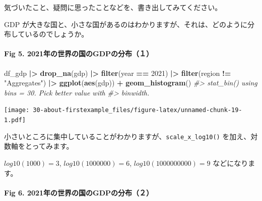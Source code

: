 \documentclass[
  xelatex, ja=standard]{bxjsbook}
\newenvironment{Shaded}{\begin{snugshade}}{\end{snugshade}}
\newcommand{\CommentTok}[1]{\textcolor[rgb]{0.56,0.35,0.01}{\textit{#1}}}
\newcommand{\DecValTok}[1]{\textcolor[rgb]{0.00,0.00,0.81}{#1}}
\newcommand{\FunctionTok}[1]{\textcolor[rgb]{0.13,0.29,0.53}{\textbf{#1}}}
\newcommand{\NormalTok}[1]{#1}
\newcommand{\SpecialCharTok}[1]{\textcolor[rgb]{0.81,0.36,0.00}{\textbf{#1}}}
\newcommand{\StringTok}[1]{\textcolor[rgb]{0.31,0.60,0.02}{#1}}
\theoremstyle{definition}
\theoremstyle{definition}
\theoremstyle{definition}
\theoremstyle{definition}
\theoremstyle{remark}
\begin{document}
気づいたこと、疑問に思ったことなどを、書き出してみてください。

GDP が大きな国と、小さな国があるのはわかりますが、それは、どのように分布しているのでしょうか。

\hypertarget{fig-5.-2021ux5e74ux306eux4e16ux754cux306eux56fdux306egdpux306eux5206ux5e03uxff11}{%
\paragraph{Fig 5. 2021年の世界の国のGDPの分布（１）}\label{fig-5.-2021ux5e74ux306eux4e16ux754cux306eux56fdux306egdpux306eux5206ux5e03uxff11}}

\begin{Shaded}
\begin{Highlighting}[]
\NormalTok{df\_gdp }\SpecialCharTok{|\textgreater{}} \FunctionTok{drop\_na}\NormalTok{(gdp) }\SpecialCharTok{|\textgreater{}} 
  \FunctionTok{filter}\NormalTok{(year }\SpecialCharTok{==} \DecValTok{2021}\NormalTok{) }\SpecialCharTok{|\textgreater{}} \FunctionTok{filter}\NormalTok{(region }\SpecialCharTok{!=} \StringTok{"Aggregates"}\NormalTok{) }\SpecialCharTok{|\textgreater{}}
  \FunctionTok{ggplot}\NormalTok{(}\FunctionTok{aes}\NormalTok{(gdp)) }\SpecialCharTok{+} \FunctionTok{geom\_histogram}\NormalTok{()}
\CommentTok{\#\textgreater{} \textasciigrave{}stat\_bin()\textasciigrave{} using \textasciigrave{}bins = 30\textasciigrave{}. Pick better value with}
\CommentTok{\#\textgreater{} \textasciigrave{}binwidth\textasciigrave{}.}
\end{Highlighting}
\end{Shaded}

\texttt{[image: 30-about-firstexample\_files/figure-latex/unnamed-chunk-19-1.pdf]}

小さいところに集中していることがわかりますが、\texttt{scale\_x\_log10()} を加え、対数軸をとってみます。

\(log10(1000) = 3\), \(log10(1000000) = 6\), \(log10(1000000000) = 9\) などになります。

\hypertarget{fig-6.-2021ux5e74ux306eux4e16ux754cux306eux56fdux306egdpux306eux5206ux5e03uxff12}{%
\paragraph{Fig 6. 2021年の世界の国のGDPの分布（２）}\label{fig-6.-2021ux5e74ux306eux4e16ux754cux306eux56fdux306egdpux306eux5206ux5e03uxff12}}
\end{document}
